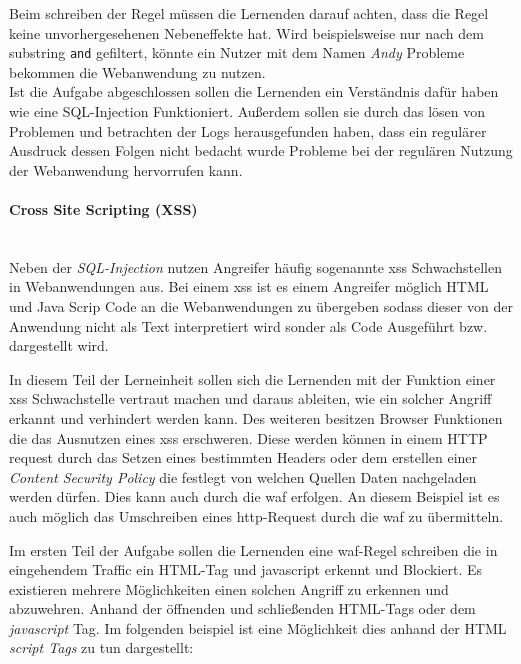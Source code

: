 Beim schreiben der Regel müssen die Lernenden darauf achten, dass die Regel keine unvorhergesehenen Nebeneffekte hat.
Wird beispielsweise nur nach dem substring \verb|and| gefiltert, könnte ein Nutzer mit dem Namen \textit{Andy} Probleme bekommen die Webanwendung zu nutzen.\\


Ist die Aufgabe abgeschlossen sollen die Lernenden ein Verständnis dafür haben wie eine SQL-Injection Funktioniert.
Außerdem sollen sie durch das lösen von Problemen und betrachten der Logs herausgefunden haben, dass ein regulärer Ausdruck dessen Folgen nicht bedacht wurde Probleme bei der regulären Nutzung der Webanwendung hervorrufen kann.

\paragraph{Cross Site Scripting (XSS)}\ \\

Neben der \textit{SQL-Injection} nutzen Angreifer häufig sogenannte \ac{xss} Schwachstellen in Webanwendungen aus.
Bei einem \ac{xss} ist es einem Angreifer möglich HTML und Java Scrip Code an die Webanwendungen zu übergeben sodass dieser von der Anwendung nicht als Text interpretiert wird sonder als Code Ausgeführt bzw. dargestellt wird.

In diesem Teil der Lerneinheit sollen sich die Lernenden mit der Funktion einer \ac{xss} Schwachstelle vertraut machen und daraus ableiten, wie ein solcher Angriff erkannt und verhindert werden kann.
Des weiteren besitzen Browser Funktionen die das Ausnutzen eines \ac{xss} erschweren.
Diese werden können in einem HTTP request durch das Setzen eines bestimmten Headers oder dem erstellen einer \textit{Content Security Policy} die festlegt von welchen Quellen Daten nachgeladen werden dürfen.
Dies kann auch durch die \ac{waf} erfolgen.
An diesem Beispiel ist es auch möglich das Umschreiben eines \ac{http}-Request durch die \ac{waf} zu übermitteln.

Im ersten Teil der Aufgabe sollen die Lernenden eine \ac{waf}-Regel schreiben die in eingehendem Traffic ein HTML-Tag und javascript erkennt und Blockiert.
Es existieren mehrere Möglichkeiten einen solchen Angriff zu erkennen und abzuwehren.
Anhand der öffnenden und schließenden HTML-Tags oder dem \textit{javascript} Tag.
Im folgenden beispiel ist eine Möglichkeit dies anhand der HTML \textit{script Tags} zu tun dargestellt:\\

